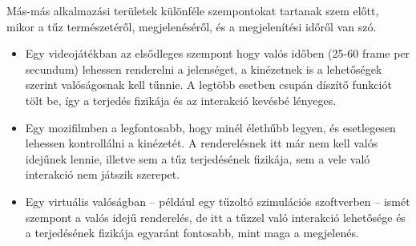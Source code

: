 Más-más alkalmazási területek különféle szempontokat tartanak szem előtt, mikor a tűz természetéről, megjelenéséről, és a megjelenítési időről van szó.

\begin{itemize}
\item
Egy videojátékban az elsődleges szempont hogy valós időben (25-60 frame per secundum) lehessen renderelni a jelenséget, a kinézetnek is a lehetőségek szerint valóságosnak kell tűnnie. A legtöbb esetben csupán díszítő funkciót tölt be, így a terjedés fizikája és az interakció kevésbé lényeges.
\item
Egy mozifilmben a legfontosabb, hogy minél élethűbb legyen, és esetlegesen lehessen kontrollálni a kinézetét. A renderelésnek itt már nem kell valós idejűnek lennie, illetve sem a tűz terjedésének fizikája, sem a vele való interakció nem játszik szerepet.
\item
Egy virtuális valóságban -- például egy tűzoltó szimulációs szoftverben -- ismét szempont a valós idejű renderelés, de itt a tűzzel való interakció lehetősége és a terjedésének fizikája egyaránt fontosabb, mint maga a megjelenés.
\end{itemize}
